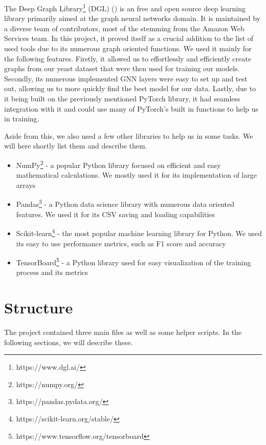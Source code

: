 \documentclass[times, utf8, diplomski, english]{fer_eng}
\begin{document}
The Deep Graph Library\footnote{https://www.dgl.ai/} (DGL) (\cite{DGL}) is an free and open source deep learning library primarily aimed at the graph neural networks domain. It is maintained by a diverse team of contributors, most of the stemming from the Amazon Web Services team. In this project, it proved itself as a crucial addition to the list of used tools due to its numerous graph oriented functions. We used it mainly for the following features. Firstly, it allowed us to effortlessly and efficiently create graphs from our yeast dataset that were then used for training our models. Secondly, its numerous implemented GNN layers were easy to set up and test out, allowing us to more quickly find the best model for our data. Lastly, due to it being built on the previously mentioned PyTorch library, it had seamless integration with it and could use many of PyTorch's built in functions to help us in training.

Aside from this, we also used a few other libraries to help us in some tasks. We will here shortly list them and describe them.

\begin{itemize}
	\item NumPy\footnote{https://numpy.org/} - a popular Python library focused on efficient and easy mathematical calculations. We mostly used it for its implementation of large arrays

	\item Pandas\footnote{https://pandas.pydata.org/} - a Python data science library with numerous data oriented features. We used it for its CSV saving and loading capabilities

	\item Scikit-learn\footnote{https://scikit-learn.org/stable/} - the most popular machine learning library for Python. We used its easy to use performance metrics, such as F1 score and accuracy

	\item TensorBoard\footnote{https://www.tensorflow.org/tensorboard} - a Python library used for easy visualization of the training process and its metrics
\end{itemize}

\section{Structure}

The project contained three main files as well as some helper scripts. In the following sections, we will describe these.
\end{document}
